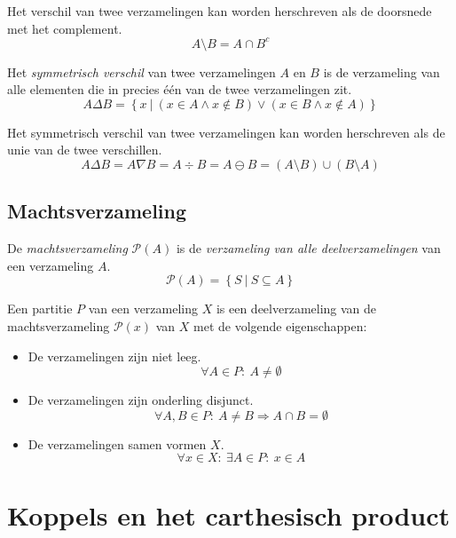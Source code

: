 \documentclass[main.tex]{subfiles}
\begin{document}
\begin{st}
  Het verschil van twee verzamelingen kan worden herschreven als de doorsnede met het complement.
  \[ A \setminus B = A \cap B^{c} \]
\end{st}


\begin{de}
  Het \emph{symmetrisch verschil} van twee verzamelingen $A$ en $B$ is de verzameling van alle elementen die in precies \'e\'en van de twee verzamelingen zit.
  \[ A \Delta B = \left\{ x\ |\ (x \in A \wedge x \not\in B) \vee (x \in B \wedge x \not\in A) \right\} \]
\end{de}

\begin{st}
  Het symmetrisch verschil van twee verzamelingen kan worden herschreven als de unie van de twee verschillen.
  \[ A \Delta B = A \nabla B = A \div B = A \ominus B = (A \setminus B) \cup (B \setminus A) \]
\end{st}

\subsection{Machtsverzameling}
\label{sec:machtsverzameling}

\begin{de}
  \label{de:machtsverzameling}
  De \emph{machtsverzameling} $\mathcal P(A)$ is de \emph{verzameling van alle deelverzamelingen} van een verzameling $A$.
  \[ \mathcal P(A) = \left\{ S\ |\ S \subseteq A \right\} \]
\end{de}

\begin{de}
  \label{de:partitie}
  Een partitie $P$ van een verzameling $X$ is een deelverzameling van de machtsverzameling $\mathcal {P}(x)$ van $X$ met de volgende eigenschappen:
  \begin{itemize}
  \item De verzamelingen zijn niet leeg.
    \[ \forall A \in P:\ A \neq \emptyset \]
  \item De verzamelingen zijn onderling disjunct.
    \[ \forall A,B \in P:\ A \neq B \Rightarrow A \cap B = \emptyset \]
  \item De verzamelingen samen vormen $X$.
    \[ \forall x \in X:\ \exists A \in P:\ x \in A \]
  \end{itemize}
\end{de}


\section{Koppels en het carthesisch product}
\label{sec:koppels-en-het-carthesisch-product}
\end{document}
